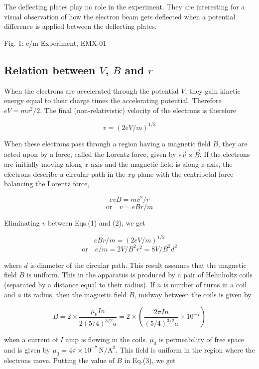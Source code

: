 \documentclass[%
sor,
 jor,
 amsmath,amssymb,
 reprint,
]{revtex4-2}
\begin{document}
The deflecting plates play no role in the experiment. They are interesting for a visual observation of how the electron beam gets deflected when a potential difference is applied between the deflecting plates.

\begin{center}
Fig. 1: e/m Experiment, EMX-01
\end{center}

\subsection{Relation between $V$, $B$ and $r$}

When the electrons are accelerated through the potential $V$, they gain kinetic energy equal to their charge times the accelerating potential. Therefore $eV = m v^{2} / 2$. The final (non-relativistic) velocity of the electrons is therefore

\begin{equation}
v = \left(2 e V / m\right) ^ {1 / 2}
\tag{1}
\end{equation}

When these electrons pass through a region having a magnetic field $B$, they are acted upon by a force, called the Lorentz force, given by $e\vec{v} \times \vec{B}$. If the electrons are initially moving along $x$-axis and the magnetic field is along $z$-axis, the electrons describe a circular path in the $xy$-plane with the centripetal force balancing the Lorentz force,

\[
e v B = m v ^ {2} / r
\]
\[
\text {or} \quad v = e B r / m \tag {2}
\]

Eliminating $v$ between Eqs.(1) and (2), we get

\[
e B r / m = \left(2 e V / m\right) ^ {1 / 2}
\]
\[
\text {or} \quad e / m = 2 V / B ^ {2} r ^ {2} = 8 V / B ^ {2} d ^ {2} \tag {3}
\]

where $d$ is diameter of the circular path. This result assumes that the magnetic field $B$ is uniform. This in the apparatus is produced by a pair of Helmholtz coils (separated by a distance equal to their radius). If $n$ is number of turns in a coil and $a$ its radius, then the magnetic field $B$, midway between the coils is given by

$$B = 2 \times \frac{\mu_0 I n }{2(5/4)^{3/2}a} = 2 \times \left( \frac{2\pi I n}{(5/4)^{3/2}a} \times 10^{-7} \right)$$

when a current of $I$ amp is flowing in the coils. $\mu_0$ is permeability of free space and is given by $\mu_0 = 4\pi \times 10^{-7} \, \mathrm{N / A^2}$. This field is uniform in the region where the electrons move. Putting the value of $B$ in Eq.(3), we get
\end{document}
